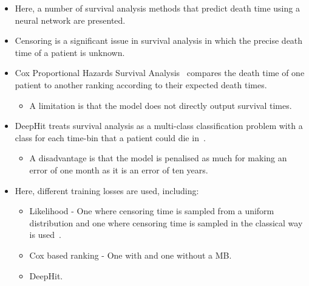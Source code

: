 \documentclass[portrait, color=UCLburgundy, margin=1cm]{uclposter}
\begin{document}
\begin{multicols}{2}
\begin{highlightbox}[UCLlightgreen]
\begin{itemize}
                    \item Here, a number of survival analysis methods that predict death time using a neural network are presented.

                    \item Censoring is a significant issue in survival analysis in which the precise death time of a patient is unknown.
                    
                    \item Cox Proportional Hazards Survival Analysis~\cite{Cox1972RegressionLife-Tables} compares the death time of one patient to another ranking according to their expected death times.

                    \begin{itemize}
                        \item A limitation is that the model does not directly output survival times.
                    \end{itemize}

                    \item DeepHit treats survival analysis as a multi-class classification problem with a class for each time-bin that a patient could die in~\cite{Lee2018DeepHit:Risks}.
                    
                    \begin{itemize}
                        \item A disadvantage is that the model is penalised as much for making an error of one month as it is an error of ten years.
                    \end{itemize}

                    \item Here, different training losses are used, including:

                    \begin{itemize}
                        \item Likelihood -  One where censoring time is sampled from a uniform distribution and one where censoring time is sampled in the classical way is used~\cite{Shahin2023DeepAnalysis}.
                        
                        \item Cox based ranking - One with and one without a \gls{MB}.
                        
                        \item DeepHit.
                    \end{itemize}
                \end{itemize}
            \end{highlightbox}


\end{multicols}
\end{document}
